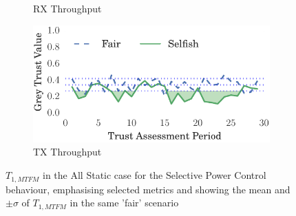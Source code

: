 \documentclass[runningheads,a4paper]{llncs}
\begin{document}
\begin{figure}[h]
\begin{subfigure}{0.5\textwidth}
  \caption{RX Throughput}
  \label{fig:static_badmouthing_rxthroughput}
\end{subfigure}
\begin{subfigure}{0.5\textwidth}
\centering
  \includegraphics[width=.95\linewidth]{img/trust_bella_static_emph_TXThroughput_BadMouthingPowerControl.pdf}
  \caption{TX Throughput}
  \label{fig:static_badmouthing_txthroughput}
\end{subfigure}
\caption{$T_{1,MTFM}$ in the All Static case for the Selective Power Control behaviour, emphasising selected metrics and showing the mean and $\pm \sigma$ of $T_{1,MTFM}$ in the same 'fair' scenario}
\label{fig:static_badmouthing}
\end{figure}
%
\end{document}
